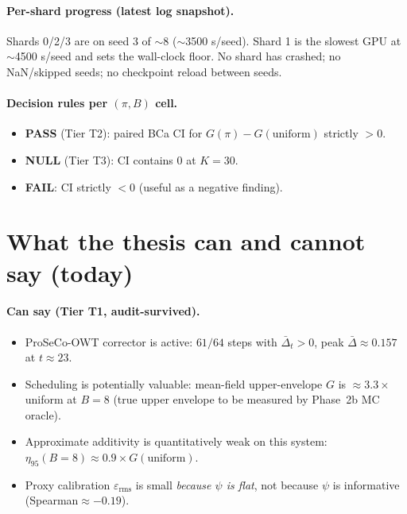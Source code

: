 \documentclass[11pt,a4paper]{article}
\newcommand{\eps}{\varepsilon}
\begin{document}
\paragraph{Per-shard progress (latest log snapshot).}
Shards 0/2/3 are on seed 3 of $\sim$8 ($\sim$3500 s/seed). Shard 1 is the
slowest GPU at $\sim$4500 s/seed and sets the wall-clock floor. No shard has
crashed; no NaN/skipped seeds; no checkpoint reload between seeds.

\paragraph{Decision rules per $(\pi, B)$ cell.}
\begin{itemize}[leftmargin=1.4em, itemsep=0pt]
  \item \textbf{PASS} (Tier T2): paired BCa CI for $G(\pi) - G(\text{uniform})$
    strictly $> 0$.
  \item \textbf{NULL} (Tier T3): CI contains $0$ at $K{=}30$.
  \item \textbf{FAIL}: CI strictly $< 0$ (useful as a negative finding).
\end{itemize}

\section{What the thesis can and cannot say (today)}

\paragraph{Can say (Tier T1, audit-survived).}
\begin{itemize}[leftmargin=1.4em, itemsep=0pt]
  \item ProSeCo-OWT corrector is active: $61/64$ steps with
    $\bar\Delta_t > 0$, peak $\bar\Delta \approx 0.157$ at $t\approx 23$.
  \item Scheduling is potentially valuable: mean-field upper-envelope $G$ is
    $\approx 3.3{\times}$ uniform at $B{=}8$ (true upper envelope to be
    measured by Phase~2b MC oracle).
  \item Approximate additivity is quantitatively weak on this system:
    $\eta_{95}(B{=}8) \approx 0.9 \times G(\text{uniform})$.
  \item Proxy calibration $\eps_{\mathrm{rms}}$ is small \emph{because $\psi$ is
    flat}, not because $\psi$ is informative (Spearman${\approx}-0.19$).
\end{itemize}
\end{document}
